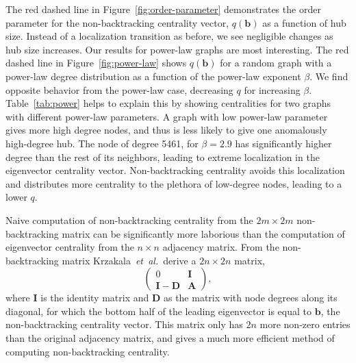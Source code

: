 \documentclass[twocolumn,prl,superscriptaddress]{revtex4}
\newcommand{\etal}{{\it{}et~al.}}
\newcommand{\mat}{\mathbf}
\renewcommand{\vec}{\mathbf}
\newcommand\colorb{red }
\begin{document}
The \colorb dashed line in Figure~\ref{fig:order-parameter} demonstrates the order parameter for the non-backtracking centrality vector, $q(\vec{b})$ as a function of hub size. Instead of a localization transition as before, we see negligible changes as hub size increases. Our results for power-law graphs are most interesting. The \colorb dashed line in Figure~\ref{fig:power-law} shows $q(\vec{b})$ for a random graph with a power-law degree distribution as a function of the power-law exponent $\beta$. We find opposite behavior from the power-law case, decreasing $q$ for increasing $\beta$. Table~\ref{tab:power} helps to explain this by showing centralities for two graphs with different power-law parameters. A graph with low power-law parameter gives more high degree nodes, and thus is less likely to give one anomalously high-degree hub. The node of degree 5461, for $\beta = 2.9$ has significantly higher degree than the rest of its neighbors, leading to extreme localization in the eigenvector centrality vector. Non-backtracking centrality avoids this localization and distributes more centrality to the plethora of low-degree nodes, leading to a lower $q$.

Naive computation of non-backtracking centrality from the $2m \times 2m$ non-backtracking matrix can be significantly more laborious than the computation of eigenvector centrality from the $n \times n$ adjacency matrix. From the non-backtracking matrix Krzakala~\etal\ derive a $2n \times 2n$ matrix, 
\begin{equation}
\left(
 \begin{array}{c|c}
 0 & \mat{I} \\
  \hline
  \mat{I} - \mat{D} & \mat{A}
 \end{array} \right),
\end{equation}
where $\mat{I}$ is the identity matrix and $\mat{D}$ as the matrix with node degrees along its diagonal, for which the bottom half of the leading eigenvector is equal to $\vec{b}$, the non-backtracking centrality vector. This matrix only has $2n$ more non-zero entries than the original adjacency matrix, and gives a much more efficient method of computing non-backtracking centrality.
\end{document}
